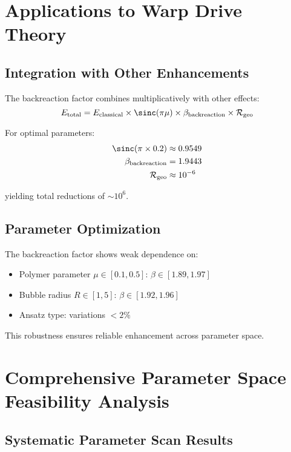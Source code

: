 \documentclass[11pt,a4paper]{article}
\begin{document}
\section{Applications to Warp Drive Theory}

\subsection{Integration with Other Enhancements}

The backreaction factor combines multiplicatively with other effects:
\begin{equation}
E_{\text{total}} = E_{\text{classical}} \times \sinc(\pi\mu) \times \beta_{\text{backreaction}} \times \mathcal{R}_{\text{geo}}
\end{equation}

For optimal parameters:
\begin{align}
\sinc(\pi \times 0.2) &\approx 0.9549 \\
\beta_{\text{backreaction}} &= 1.9443 \\
\mathcal{R}_{\text{geo}} &\approx 10^{-6}
\end{align}

yielding total reductions of $\sim 10^6$.

\subsection{Parameter Optimization}

The backreaction factor shows weak dependence on:
\begin{itemize}
\item Polymer parameter $\mu \in [0.1, 0.5]$: $\beta \in [1.89, 1.97]$
\item Bubble radius $R \in [1, 5]$: $\beta \in [1.92, 1.96]$
\item Ansatz type: variations $< 2\%$
\end{itemize}

This robustness ensures reliable enhancement across parameter space.

\section{Comprehensive Parameter Space Feasibility Analysis}

\subsection{Systematic Parameter Scan Results}
\end{document}
